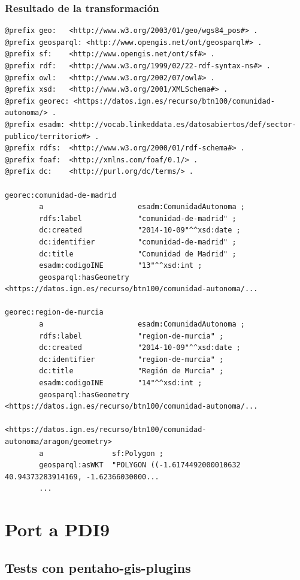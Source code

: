 \subsubsection{Resultado de la transformación}
\footnotesize
\begin{verbatim}
@prefix geo:   <http://www.w3.org/2003/01/geo/wgs84_pos#> .
@prefix geosparql: <http://www.opengis.net/ont/geosparql#> .
@prefix sf:    <http://www.opengis.net/ont/sf#> .
@prefix rdf:   <http://www.w3.org/1999/02/22-rdf-syntax-ns#> .
@prefix owl:   <http://www.w3.org/2002/07/owl#> .
@prefix xsd:   <http://www.w3.org/2001/XMLSchema#> .
@prefix georec: <https://datos.ign.es/recurso/btn100/comunidad-autonoma/> .
@prefix esadm: <http://vocab.linkeddata.es/datosabiertos/def/sector-publico/territorio#> .
@prefix rdfs:  <http://www.w3.org/2000/01/rdf-schema#> .
@prefix foaf:  <http://xmlns.com/foaf/0.1/> .
@prefix dc:    <http://purl.org/dc/terms/> .

georec:comunidad-de-madrid
        a                      esadm:ComunidadAutonoma ;
        rdfs:label             "comunidad-de-madrid" ;
        dc:created             "2014-10-09"^^xsd:date ;
        dc:identifier          "comunidad-de-madrid" ;
        dc:title               "Comunidad de Madrid" ;
        esadm:codigoINE        "13"^^xsd:int ;
        geosparql:hasGeometry  <https://datos.ign.es/recurso/btn100/comunidad-autonoma/...

georec:region-de-murcia
        a                      esadm:ComunidadAutonoma ;
        rdfs:label             "region-de-murcia" ;
        dc:created             "2014-10-09"^^xsd:date ;
        dc:identifier          "region-de-murcia" ;
        dc:title               "Región de Murcia" ;
        esadm:codigoINE        "14"^^xsd:int ;
        geosparql:hasGeometry  <https://datos.ign.es/recurso/btn100/comunidad-autonoma/...

<https://datos.ign.es/recurso/btn100/comunidad-autonoma/aragon/geometry>
        a                sf:Polygon ;
        geosparql:asWKT  "POLYGON ((-1.6174492000010632 40.94373283914169, -1.62366030000...
        ...
\end{verbatim}
\normalsize


\section{Port a PDI9}

\subsection{Tests con pentaho-gis-plugins}

